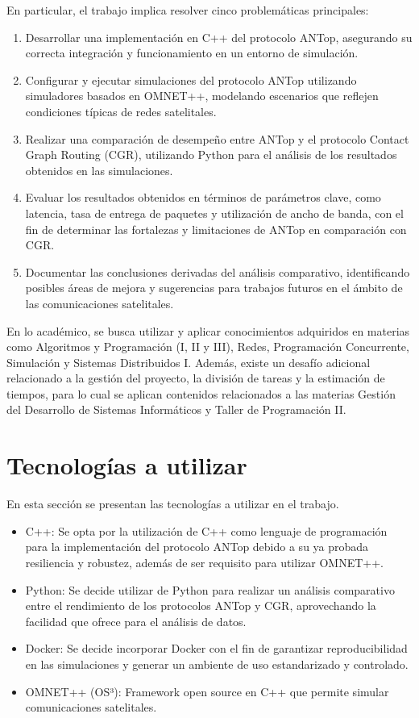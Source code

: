 En particular, el trabajo implica resolver cinco problemáticas principales:
\begin{enumerate}
    \item Desarrollar una implementación en C++ del protocolo ANTop, asegurando su correcta integración y funcionamiento en un entorno de simulación.
    \item Configurar y ejecutar simulaciones del protocolo ANTop utilizando simuladores basados en OMNET++, modelando escenarios que reflejen condiciones típicas de redes satelitales.
    \item Realizar una comparación de desempeño entre ANTop y el protocolo Contact Graph Routing (CGR), utilizando Python para el análisis de los resultados obtenidos en las simulaciones.
    \item Evaluar los resultados obtenidos en términos de parámetros clave, como latencia, tasa de entrega de paquetes y utilización de ancho de banda, con el fin de determinar las fortalezas y limitaciones de ANTop en comparación con CGR.
    \item Documentar las conclusiones derivadas del análisis comparativo, identificando posibles áreas de mejora y sugerencias para trabajos futuros en el ámbito de las comunicaciones satelitales.
\end{enumerate}

En lo académico, se busca utilizar y aplicar conocimientos adquiridos en materias como Algoritmos y Programación (I, II y III), Redes, Programación Concurrente, Simulación y Sistemas Distribuidos I. Además, existe un desafío adicional relacionado a la gestión del proyecto, la división de tareas y la estimación de tiempos, para lo cual se aplican contenidos relacionados a las materias Gestión del Desarrollo de Sistemas Informáticos y Taller de Programación II.

\section{Tecnologías a utilizar}
En esta sección se presentan las tecnologías a utilizar en el trabajo.
\begin{itemize}
    \item C++: Se opta por la utilización de C++ como lenguaje de programación para la implementación del protocolo ANTop debido a su ya probada resiliencia y robustez, además de ser requisito para utilizar OMNET++.
    \item Python: Se decide utilizar de Python para realizar un análisis comparativo entre el rendimiento de los protocolos ANTop y CGR, aprovechando la facilidad que ofrece para el análisis de datos.
    \item Docker: Se decide incorporar Docker con el fin de garantizar reproducibilidad en las simulaciones y generar un ambiente de uso estandarizado y controlado.
    \item OMNET++ (OS³): Framework open source en C++ que permite simular comunicaciones satelitales.
\end{itemize}

